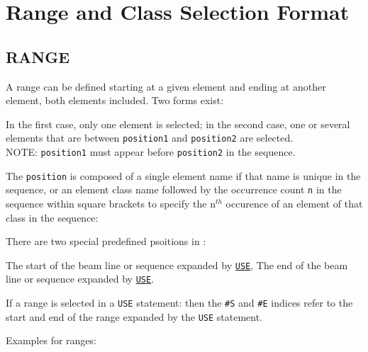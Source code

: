 
\chapter{Range and Class Selection Format}

\section{RANGE}
\label{sec:range}

A range can be defined starting at  a given element and ending at
another element, both elements included. Two forms exist:  


In the first case, only one element is selected; in the second case, one
or several elements that are between \texttt{position1} and
\texttt{position2} are selected. \\
NOTE: \texttt{position1} must appear before \texttt{position2} in the
sequence.   

The \texttt{position} is composed of a single element name if that name
is unique in the sequence, or an element class name followed by the
occurrence count \texttt{n} in the sequence within square brackets to
specify the n$^{th}$ occurence of an element of that class in the sequence:
\label{range_position}

There are two special predefined psoitions in \madx: 
\begin{madlist}
    The start of the beam line or sequence expanded by \hyperref[sec:use]{\texttt{USE}}, 
    The end of the beam line or sequence expanded by \hyperref[sec:use]{\texttt{USE}}. 
\end{madlist} 

If a range is selected in a \texttt{USE} statement: 
then the  \texttt{\#S} and \texttt{\#E} indices refer to the start and
end of the  range expanded by the \texttt{USE} statement. 

 Examples for ranges: 

